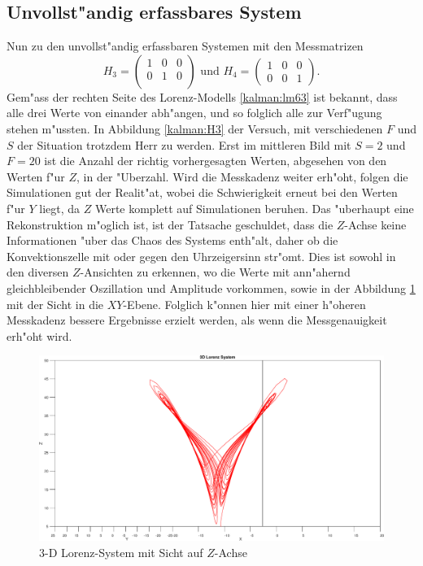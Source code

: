 \begin{refsection}
\subsection{Unvollst"andig erfassbares System}
Nun zu den unvollst"andig erfassbaren Systemen mit den Messmatrizen 
\[H_{3}=\begin{pmatrix}
1 & 0 & 0 \\ 
0 & 1 & 0 \\ 
\end{pmatrix} 
\text{ und }
H_{4}=\begin{pmatrix}
1 & 0 & 0 \\ 
0 & 0 & 1
\end{pmatrix}
\text{.}
\]
Gem"ass der rechten Seite des Lorenz-Modells \eqref{kalman:lm63} ist bekannt, dass alle drei Werte von einander abh"angen, und so folglich alle zur Verf"ugung stehen m"ussten. In Abbildung \ref{kalman:H3} der Versuch, mit verschiedenen $F$ und $S$ der Situation trotzdem Herr zu werden. Erst im mittleren Bild mit $S=2$ und $F=20$ ist die Anzahl der richtig vorhergesagten Werten, abgesehen von den Werten f"ur $Z$, in der "Uberzahl. Wird die Messkadenz weiter erh"oht, folgen die Simulationen gut der Realit"at, wobei die Schwierigkeit erneut bei den Werten f"ur $Y$ liegt, da $Z$ Werte komplett auf Simulationen beruhen. Das "uberhaupt eine Rekonstruktion m"oglich ist, ist der Tatsache geschuldet, dass die $Z$-Achse keine Informationen "uber das Chaos des Systems enth"alt, daher ob die Konvektionszelle mit oder gegen den Uhrzeigersinn str"omt. Dies ist sowohl in den diversen $Z$-Ansichten zu erkennen, wo die Werte mit ann"ahernd gleichbleibender Oszillation und Amplitude vorkommen, sowie in der Abbildung \ref{kalman:zview} mit der Sicht in die $XY$-Ebene.
Folglich k"onnen hier mit einer h"oheren Messkadenz bessere Ergebnisse erzielt werden, als wenn die Messgenauigkeit erh"oht wird.

\begin{figure}
\centering
\includegraphics[width=\hsize]{kalman/figures/zview.pdf}
\caption{3-D Lorenz-System mit Sicht auf $Z$-Achse}
\label{kalman:zview}
\end{figure}


\end{refsection}
